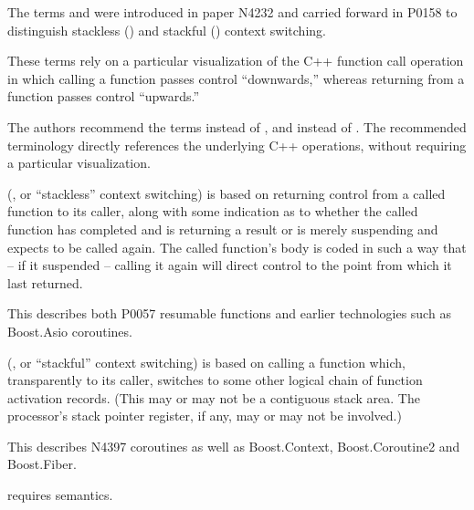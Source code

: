 The terms \susup and \susdown were introduced in paper N4232\cite{N4232} and
carried forward in P0158\cite{P0158} to distinguish stackless
(\susup) and stackful (\susdown) context switching.

These terms rely on a particular visualization of the C++ function call
operation in which calling a function passes control ``downwards,'' whereas
returning from a function passes control ``upwards.''

The authors recommend the terms \susreturn instead of \susup, and \suscall
instead of \susdown. The recommended terminology directly references the
underlying C++ operations, without requiring a particular visualization.

\susreturn (\susup, or ``stackless'' context switching) is based on returning
control from a called function to its caller, along with some indication as to
whether the called function has completed and is returning a result or is
merely suspending and expects to be called again. The called function's body
is coded in such a way that -- if it suspended -- calling it again will direct
control to the point from which it last returned.

This describes both P0057\cite{P0057} resumable functions and earlier
technologies such as Boost.Asio coroutines\cite{basiocoro}.

\suscall (\susdown, or ``stackful'' context switching) is based on calling a
function which, transparently to its caller, switches to some other logical
chain of function activation records. (This may or may not be a contiguous
stack area. The processor's stack pointer register, if any, may or may not
be involved.)

This describes N4397\cite{N4397} coroutines as well as
Boost.Context\cite{bcontext}, Boost.Coroutine2\cite{bcoroutine2} and
Boost.Fiber\cite{bfiber}.

 requires \suscall semantics.
